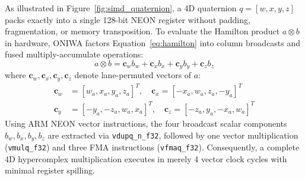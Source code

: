 \documentclass[10pt,twocolumn,letterpaper]{article}
\begin{document}
As illustrated in Figure~\ref{fig:simd_quaternion}, a 4D quaternion $q = [w, x, y, z]$ packs exactly into a single 128-bit NEON register without padding, fragmentation, or memory transposition. To evaluate the Hamilton product $a \otimes b$ in hardware, ONIWA factors Equation~\ref{eq:hamilton} into column broadcasts and fused multiply-accumulate operations:
\begin{equation}
a \otimes b = \mathbf{c}_w b_w + \mathbf{c}_x b_x + \mathbf{c}_y b_y + \mathbf{c}_z b_z
\end{equation}
where $\mathbf{c}_w, \mathbf{c}_x, \mathbf{c}_y, \mathbf{c}_z$ denote lane-permuted vectors of $a$:
\begin{equation}
\begin{aligned}
\mathbf{c}_w &= [w_a, x_a, y_a, z_a]^T, \quad \mathbf{c}_x = [-x_a, w_a, z_a, -y_a]^T \\
\mathbf{c}_y &= [-y_a, -z_a, w_a, x_a]^T, \quad \mathbf{c}_z = [-z_a, y_a, -x_a, w_a]^T
\end{aligned}
\end{equation}
Using ARM NEON vector instructions, the four broadcast scalar components $b_w, b_x, b_y, b_z$ are extracted via \texttt{vdupq\_n\_f32}, followed by one vector multiplication (\texttt{vmulq\_f32}) and three FMA instructions (\texttt{vfmaq\_f32}). Consequently, a complete 4D hypercomplex multiplication executes in merely 4 vector clock cycles with minimal register spilling.
\end{document}
